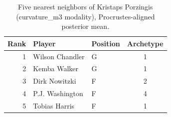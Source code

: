 \begin{table}[htbp]
  \centering\small
  \begin{tabular}{rllc}
    \toprule
    Rank & Player & Position & Archetype \\
    \midrule
    1 & Wilson Chandler & G & 1 \\
    2 & Kemba Walker & G & 1 \\
    3 & Dirk Nowitzki & F & 2 \\
    4 & P.J. Washington & F & 4 \\
    5 & Tobias Harris & F & 1 \\
    \bottomrule
  \end{tabular}
  \caption{Five nearest neighbors of Kristaps Porzingis (curvature_m3 modality), Procrustes-aligned posterior mean.}
  \label{tab:Kristaps_Porzingis_neighbors_curvature_m3}
\end{table}

